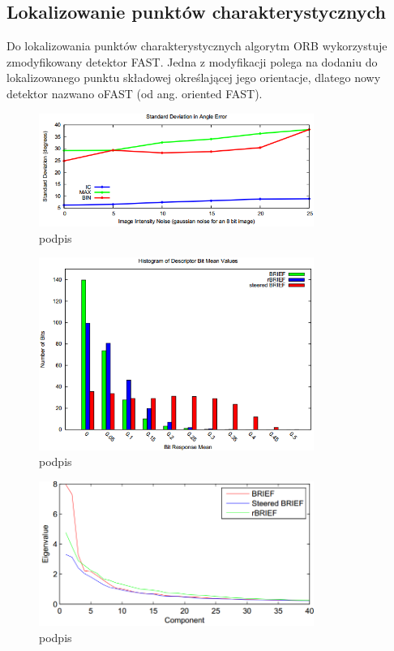 \subsection{Lokalizowanie punktów charakterystycznych}
Do lokalizowania punktów charakterystycznych algorytm ORB wykorzystuje zmodyfikowany detektor FAST. Jedna z modyfikacji polega na dodaniu do lokalizowanego punktu składowej określającej jego orientacje, dlatego nowy detektor nazwano oFAST (od ang. oriented FAST).


\begin{figure}
\centering
\includegraphics[width=0.8\textwidth]{pict/02/orb/orb_wykres_2.png}
\caption{podpis}
\label{fig:orb_wykres_2}
\end{figure}

\begin{figure}
\centering
\includegraphics[width=0.8\textwidth]{pict/02/orb/orb_wykres_3.png}
\caption{podpis}
\label{fig:orb_wykres_3}
\end{figure}


\begin{figure}
\centering
\includegraphics[width=0.8\textwidth]{pict/02/orb/orb_wykres_4.png}
\caption{podpis}
\label{fig:orb_wykres_4}
\end{figure}


